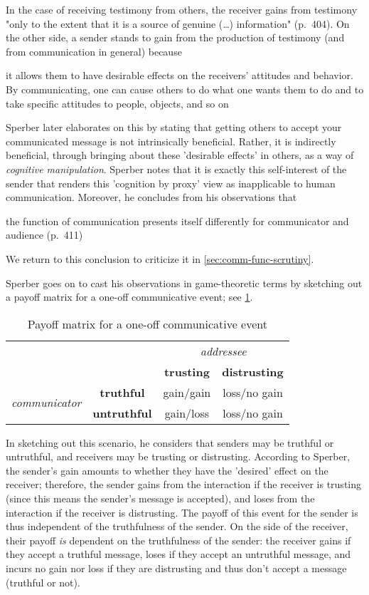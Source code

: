 In the case of receiving testimony from others, the receiver gains from testimony "only to the extent that it is a source of genuine (\ldots) information" (p.~404).
On the other side, a sender stands to gain from the production of testimony (and from communication in general) because
\begin{quoting}
    it allows them to have desirable effects on the receivers' attitudes and behavior. By communicating, one can cause others to do what one wants them to do and to take specific attitudes to people, objects, and so on
    \hfill \citep[p.~404]{Sperber01}
\end{quoting}
Sperber later elaborates on this by stating that getting others to accept your communicated message is not intrinsically beneficial. Rather, it is indirectly beneficial, through bringing about these 'desirable effects' in others, as a way of \emph{cognitive manipulation}.
Sperber notes that it is exactly this self-interest of the sender that renders this 'cognition by proxy' view as inapplicable to human communication.
Moreover, he concludes from his observations that
\begin{quoting}
    the function of communication presents itself differently for communicator and audience
    \hfill (p.~411)
\end{quoting}
We return to this conclusion to criticize it in \cref{sec:comm-func-scrutiny}.

Sperber goes on to cast his observations in game-theoretic terms by sketching out a payoff matrix for a one-off communicative event; see \cref{tab:matrix}.

\begin{table}[ht]
    \centering
    \begin{tabular}{ccc|c}
      \cline{3-4}
      & & \multicolumn{2}{c}{\emph{addressee}} \\ \cline{3-4}
      & & \textbf{trusting} & \textbf{distrusting} \\ \hline
      \multirow{2}{*}{\emph{communicator}} &
      \textbf{truthful} & gain/gain & loss/no gain \\ \cline{2-4}
      & \textbf{untruthful} & gain/loss & loss/no gain \\ \hline
    \end{tabular}
    \caption{Payoff matrix for a one-off communicative event}
    \label{tab:matrix}
\end{table}

In sketching out this scenario, he considers that senders may be truthful or untruthful, and receivers may be trusting or distrusting. According to Sperber, the sender's gain amounts to whether they have the 'desired' effect on the receiver; therefore, the sender gains from the interaction if the receiver is trusting (since this means the sender's message is accepted), and loses from the interaction if the receiver is distrusting. The payoff of this event for the sender is thus independent of the truthfulness of the sender. On the side of the receiver, their payoff \emph{is} dependent on the truthfulness of the sender: the receiver gains if they accept a truthful message, loses if they accept an untruthful message, and incurs no gain nor loss if they are distrusting and thus don't accept a message (truthful or not).

